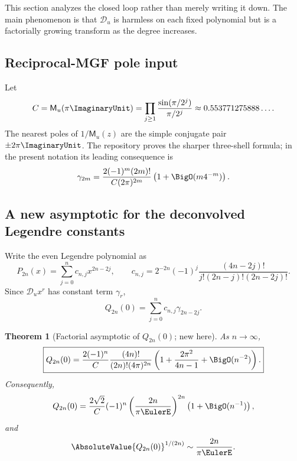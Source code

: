 \documentclass[11pt]{article}
\newtheorem{theorem}{Theorem}[section]
\theoremstyle{definition}
\theoremstyle{remark}
\newcommand{\MM}{\mathsf M}
\newcommand{\Dscr}{\mathscr D_{u}}
\begin{document}
This section analyzes the closed loop rather than merely writing it down.  The
main phenomenon is that $\Dscr$ is harmless on each fixed polynomial but is a
factorially growing transform as the degree increases.

\subsection{Reciprocal-MGF pole input}

Let
\begin{equation}
 C=\MM_u(\pi\ImaginaryUnit)
 =\prod_{j\ge1}\frac{\sin(\pi/2^j)}{\pi/2^j}
 \approx0.553771275888\ldots.
 \label{eq:C-constant}
\end{equation}
The nearest poles of $1/\MM_u(z)$ are the simple conjugate pair
$\pm2\pi\ImaginaryUnit$.  The repository proves the sharper three-shell formula; in the
present notation its leading consequence is
\begin{equation}
 \gamma_{2m}=\frac{2(-1)^m(2m)!}{C(2\pi)^{2m}}
 \left(1+\BigO(m4^{-m})\right).
 \label{eq:gamma-asymptotic}
\end{equation}

\subsection{A new asymptotic for the deconvolved Legendre constants}

Write the even Legendre polynomial as
\begin{equation}
 P_{2n}(x)=\sum_{j=0}^{n}c_{n,j}x^{2n-2j},
 \qquad
 c_{n,j}=2^{-2n}(-1)^j
 \frac{(4n-2j)!}{j!(2n-j)!(2n-2j)!}.
 \label{eq:Legendre-coeffs-even}
\end{equation}
Since $\Dscr x^r$ has constant term $\gamma_r$,
\begin{equation}
 Q_{2n}(0)=\sum_{j=0}^{n}c_{n,j}\gamma_{2n-2j}.
 \label{eq:Q0-finite-sum}
\end{equation}

\begin{theorem}[Factorial asymptotic of \texorpdfstring{$Q_{2n}(0)$}{Q2n(0)}; new here]
\label{thm:Q0-asymptotic}
As $n\to\infty$,
\begin{equation}
 \boxed{
 Q_{2n}(0)=
 \frac{2(-1)^n}{C}\frac{(4n)!}{(2n)!(4\pi)^{2n}}
 \left(1+\frac{2\pi^2}{4n-1}+\BigO(n^{-2})\right).}
 \label{eq:Q0-asymptotic}
\end{equation}
Consequently,
\begin{equation}
 Q_{2n}(0)=\frac{2\sqrt2}{C}(-1)^n
 \left(\frac{2n}{\pi\EulerE}\right)^{2n}
 \left(1+\BigO(n^{-1})\right),
 \label{eq:Q0-Stirling}
\end{equation}
and
\begin{equation}
 \AbsoluteValue{Q_{2n}(0)}^{1/(2n)}\sim\frac{2n}{\pi\EulerE}.
 \label{eq:Q0-root}
\end{equation}
\end{theorem}
\end{document}
